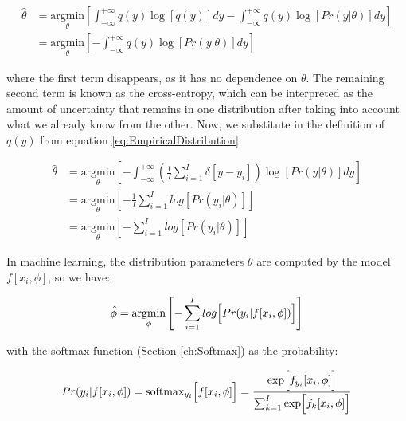\begin{equation}
\begin{aligned}
    \hat{\theta} & = \underset{\theta}{\text{argmin}}\left[\int_{-\infty}^{+\infty} q(y) \log [q(y)] d y-\int_{-\infty}^{+\infty} q(y) \log [Pr(y|\theta)] dy\right] \\
    & = \underset{\theta}{\text{argmin}}\left[-\int_{-\infty}^{+\infty} q(y) \log [Pr(y|\theta)] d y\right]
\end{aligned}
\end{equation}

\noindent where the first term disappears, as it has no dependence on $\theta$. The remaining second term is known as the cross-entropy, which can be interpreted as the amount of uncertainty that remains in one distribution after taking into account what we already know from the other. Now, we substitute in the definition of $q(y)$ from equation \ref{eq:EmpiricalDistribution}:

\begin{equation}
\begin{aligned}
    \hat{\theta} 
    & = \underset{\theta}{\text{argmin}}\left[-\int_{-\infty}^{+\infty} \left(\frac{1}{I} \sum_{i=1}^{I} \delta\left[y-y_{i}\right]\right) \log [Pr(y|\theta)] d y\right] \\
    & = \underset{\theta}{\text{argmin}}\left[-\frac{1}{I} \sum_{i=1}^{I}log[Pr(y_{i}|\theta)]\right] \\
    & = \underset{\theta}{\text{argmin}}\left[-\sum_{i=1}^{I}log[Pr(y_{i}|\theta)]\right]
\end{aligned}
\end{equation}

\noindent In machine learning, the distribution parameters $\theta$ are computed by the model $f[x_{i}, \phi]$, so we have:

\begin{equation}
    \hat{\phi} = \underset{\phi}{\text{argmin}}\left[-\sum_{i=1}^{I}log\Bigl[Pr(y_{i}|f[x_{i}, \phi])\Bigr]\right]
\end{equation}

\noindent with the softmax function (Section \ref{ch:Softmax}) as the probability:

\begin{equation}
    Pr(y_{i}|f[x_{i}, \phi]) = \text{softmax}_{y_{i}}\Bigl[f[x_{i}, \phi]\Bigr] = \frac{\exp \Bigl[f_{y_{i}}[x_{i}, \phi]\Bigr]}{\sum_{k=1}^{I} \exp \Bigl[f_{k}[x_{i}, \phi]\Bigr]}
\end{equation}

